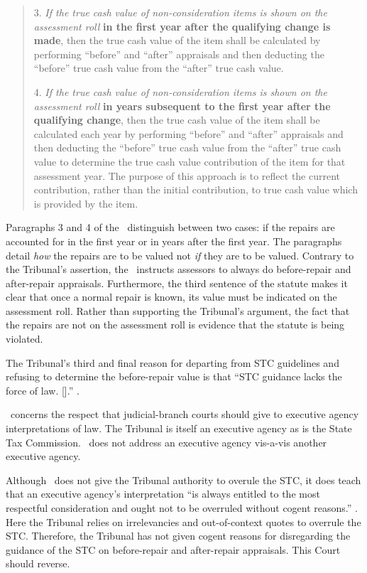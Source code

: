 \documentclass[12pt,\documentclassflag]{michiganCourtOfAppealsBrief}
\begin{document}
\begin{quotation}
3. {\em If the true cash value of non-consideration items is shown on the assessment roll} \textbf{in the first year after the qualifying change is made}, then the true cash value of the item shall be calculated by performing ``before'' and ``after'' appraisals and then deducting the ``before'' true cash value from the ``after'' true cash value.

4. {\em If the true cash value of non-consideration items is shown on the assessment roll} \textbf{in years subsequent to the first year after the qualifying change}, then the true cash value of the item shall be calculated each year by performing ``before'' and ``after'' appraisals and then deducting the ``before'' true cash value from the ``after'' true cash value to determine the true cash value contribution of the item for that assessment year. The purpose of this approach is to reflect the current contribution, rather than the initial contribution, to true cash value which is provided by the item.
\end{quotation}

Paragraphs 3 and 4 of the \cite[s]{STC Bulletin}\ distinguish between two cases: if the repairs are accounted for in the first year or in years after the first year. The paragraphs detail {\em how} the repairs are to be valued not {\em if} they are to be valued. Contrary to the Tribunal's assertion, the \cite[s]{STC Bulletin}\ instructs assessors to always do before-repair and after-repair appraisals. Furthermore, the third sentence of the statute makes it clear that once a normal repair is known, its value must be indicated on the assessment roll. Rather than supporting the Tribunal's argument, the fact that the repairs are not on the assessment roll is evidence that the statute is being violated. 

The Tribunal's third and final reason for departing from STC guidelines and refusing to determine the before-repair value is that ``STC guidance lacks the force of law. [].'' \reconsiderationDenied[2].

\cite[s]{Rovas}\ concerns the respect that judicial-branch courts should give to executive agency interpretations of law. The Tribunal is itself an executive agency as is the State Tax Commission. \cite[s]{Rovas}\ does not address an executive agency vis-a-vis another executive agency.

Although \cite[s]{Rovas}\ does not give the Tribunal authority to overule the STC, it does teach that an executive agency's interpretation ``is always entitled to the most respectful consideration and ought not to be overruled without cogent reasons.'' . Here the Tribunal relies on irrelevancies and out-of-context quotes to overrule the STC.
Therefore, the Tribunal has not given cogent reasons for disregarding the guidance of the STC on before-repair and after-repair appraisals. This Court should reverse. 
\end{document}
